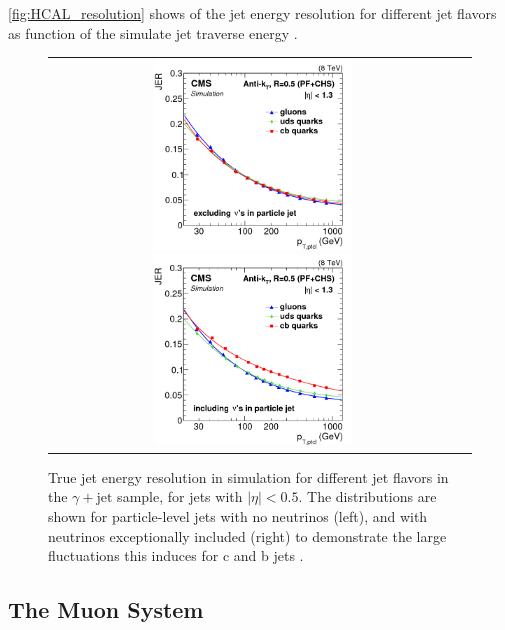 \autoref{fig:HCAL_resolution} shows of the jet energy resolution for different jet flavors as function of the simulate jet traverse energy \cite{Khachatryan:2016kdb}.

\begin{figure}[tbh!]
	\centering
	\begin{tabular}{cc}
		\includegraphics[width=0.50\textwidth]{detector/pics/JER_8tev_nonu.png}
		\includegraphics[width=0.50\textwidth]{detector/pics/JER_8tev_nu.png}
	\end{tabular}
	\caption{True jet energy resolution in simulation for different jet flavors in the $\gamma + \text{jet}$ sample, for jets with $| \eta | < 0.5$. The distributions are shown for particle-level jets with no neutrinos (left), and with neutrinos exceptionally included (right) to demonstrate the large fluctuations this induces for c and b jets \cite{Khachatryan:2016kdb}.}
	\label{fig:HCAL_resolution}
\end{figure}

\clearpage

\subsection{The Muon System}

